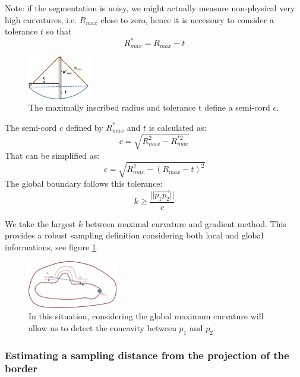 \documentclass[11pt,a4paper]{article}
\begin{document}
Note: if the segmentation is noisy, we might actually measure non-physical very high curvatures, i.e. $R_{max}$ close to zero, hence it is necessary to consider a tolerance $t$ so that 
\begin{equation}
R_{max}^* = R_{max} - t
\end{equation}

\begin{figure}[h!]
			\centering
			\includegraphics[width=0.25\textwidth]{Drawings/CurvatureTolerance.png}
			\caption{The maximally inscribed radius and tolerance t define a semi-cord $c$.}
\end{figure}

The semi-cord $c$ defined by $R_{max}^*$ and $t$ is calculated as:
\begin{equation}
c = \sqrt{R_{max}^2 - R_{max}^{*2}}
\end{equation} 
That can be simplified as:
\begin{equation}
c = \sqrt{R_{max}^2 - (R_{max} - t)^2}
\end{equation}
The global boundary follows this tolerance:
\begin{equation}
k \geq \frac{||\overset{\rightarrow}{p_1p_2}||}{c}
\end{equation}

We take the largest $k$ between maximal curvature and gradient method. This provides a robust sampling definition considering both local and global informations, see figure \ref{test sampling}.
\begin{figure}[h!]
			\label{test sampling}
			\centering
			\includegraphics[width=0.35\textwidth]{Drawings/CurvatureTestExample2.png}
			\caption{In this situation, considering the global maximum curvature will allow us to detect the concavity between $p_1$ and $p_2$.}
\end{figure}

\subsubsection{Estimating a sampling distance from the projection of the border}
\end{document}
